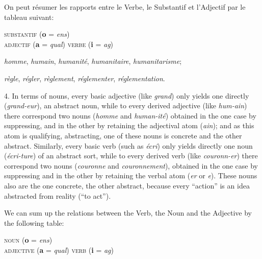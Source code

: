 \begin{sloppypar}
{  On peut résumer les rapports entre le Verbe, le Substantif et
  l’Adjectif par le tableau suivant:

  \begin{center}
    \textsc{substantif} (\textbf{o} = \emph{ens})\\
    \textsc{adjectif} (\textbf{a} = \emph{qual})\hspace{2em}
    \textsc{verbe} (\textbf{i} = \emph{ag})
  \end{center}


}
%
{\noindent
  \begin{center}
    \emph{homme}, \emph{humain}, \emph{humanité}, \emph{humanitaire}, \emph{humanitarisme};
  \end{center}
  \begin{center}
    \emph{règle}, \emph{régler}, \emph{règlement}, \emph{réglementer}, \emph{réglementation}.
  \end{center}
  
  4. In terms of nouns, every basic adjective (like \emph{grand}) only
  yields one directly (\emph{grand-eur}), an abstract noun, while to
  every derived adjective (like \emph{hum-ain}) there correspond two
  nouns (\emph{homme} and \emph{human-ité}) obtained in the one case
  by suppressing, and in the other by retaining the adjectival atom
  (\emph{ain}); and as this atom is qualifying, abstracting, one of
  these nouns is concrete and the other abstract. Similarly, every
  basic verb (such as \emph{écri}) only yields directly one noun
  (\emph{écri-ture}) of an abstract sort, while to every derived verb
  (like \emph{couronn-er}) there correspond two nouns (\emph{couronne}
  and \emph{couronnement}), obtained in the one case by suppressing
  and in the other by retaining the verbal atom (\emph{er} or
  \emph{e}). These nouns also are the one concrete, the other
  abstract, because every ``action'' is an idea abstracted from
  reality (``to act'').

  We can sum up the relations between the Verb, the Noun and the
  Adjective by the following table:

  \begin{center}
    \textsc{noun} (\textbf{o} = \emph{ens})\\
    \textsc{adjective} (\textbf{a} = \emph{qual})\hspace{2em}
    \textsc{verb} (\textbf{i} = \emph{ag})
  \end{center}

}

\end{sloppypar}
